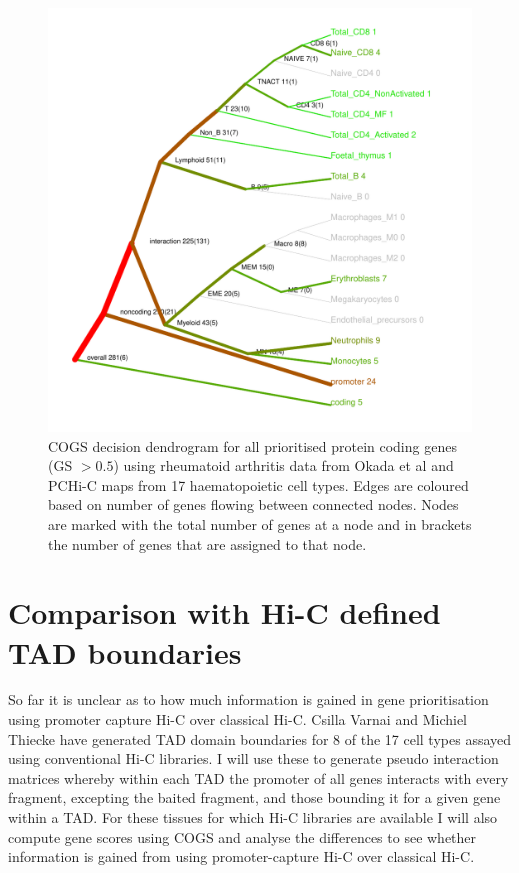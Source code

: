 \documentclass[a4paper,11pt]{report}
\begin{document}
\begin{figure}[ht]
\includegraphics[width=\textwidth]{RA_dend.pdf}
\caption{COGS decision dendrogram for all prioritised protein coding genes (GS $> 0.5$) using rheumatoid arthritis data from Okada et al and PCHi-C maps from 17 haematopoietic cell types. Edges are coloured based on number of genes flowing between connected nodes. Nodes are marked with the total number of genes at a node and in brackets the number of genes that are assigned to that node.}
\label{fig:RA_dend}
\end{figure}


\section{Comparison with Hi-C defined TAD boundaries}
So far it is unclear as to how much information is gained in gene prioritisation using promoter capture Hi-C over classical Hi-C. Csilla Varnai and Michiel Thiecke have generated TAD domain boundaries for 8 of the 17 cell types assayed using conventional Hi-C libraries. I will use these to generate pseudo interaction matrices whereby within each TAD the promoter of all genes interacts with every fragment, excepting the baited fragment, and those bounding it for a given gene within a TAD. For these tissues for which Hi-C libraries are available I will also compute gene scores using COGS and analyse the differences to see whether information is gained from using promoter-capture Hi-C over classical Hi-C. 
\end{document}
